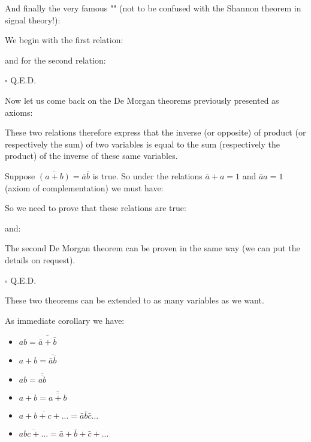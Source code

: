 	\begin{theorem}
	And finally the very famous "" (not to be confused with the Shannon theorem in signal theory!):
	
	\end{theorem}
	\begin{dem}
	We begin with the first relation:
	
	and for the second relation:
	
	\begin{flushright}
		$\square$  Q.E.D.
	\end{flushright}
	\end{dem}
	\begin{theorem}
	Now let us come back on the De Morgan theorems previously presented as axioms:
	
	These two relations therefore express that the inverse (or opposite) of  product (or respectively the sum) of two variables is equal to the sum (respectively the product) of the inverse of these same variables.
	\end{theorem}
	\begin{dem}
	Suppose $\overline{(a+b)}=\bar{a}\bar{b}$ is true. So under the relations $\bar{a}+a=1$ and $\bar{a}a=1$ (axiom of complementation) we must have:
	
	So we need to prove that these relations are true:
	
	and:
	
	The second De Morgan theorem can be proven in the same way (we can put the details on request).
	\begin{flushright}
		$\square$  Q.E.D.
	\end{flushright}
	\end{dem}
	\begin{tcolorbox}[title=Remark,colframe=black,arc=10pt]
	These two theorems can be extended to as many variables as we want.
	\end{tcolorbox}
	\begin{corollary}
	As immediate corollary we have:
	\begin{itemize}
		\item $ab=\overline{\bar{a}+\bar{b}}$
		\item $a+b=\overline{\bar{a}\bar{b}}$
		\item $ab=\overline{\overline{ab}}$
		\item $a+b=\overline{\overline{a+b}}$
		\item $\overline{a+b+c+...}=\bar{a}\bar{b}\bar{c}...$
		\item $\overline{abc+...}=\bar{a}+\bar{b}+\bar{c}+...$
	\end{itemize}
	\end{corollary}
